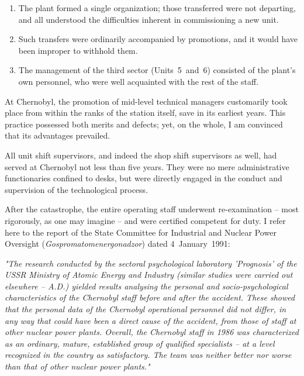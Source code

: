 \documentclass[openright]{bookest}
\begin{document}
\begin{enumerate}
  \item The plant formed a single organization; those transferred were not departing, and all understood the difficulties inherent in commissioning a new unit.
  \item Such transfers were ordinarily accompanied by promotions, and it would have been improper to withhold them.
  \item The management of the third sector (Units~5~and~6) consisted of the plant's own personnel, who were well acquainted with the rest of the staff.
\end{enumerate}

At Chernobyl, the promotion of mid-level technical managers customarily took place from within the ranks of the station itself, save in its earliest years. This practice possessed both merits and defects; yet, on the whole, I am convinced that its advantages prevailed.

All unit shift supervisors, and indeed the shop shift supervisors as well, had served at Chernobyl not less than five years. They were no mere administrative functionaries confined to desks, but were directly engaged in the conduct and supervision of the technological process.

After the catastrophe, the entire operating staff underwent re-examination -- most rigorously, as one may imagine -- and were certified competent for duty. I refer here to the report of the State Committee for Industrial and Nuclear Power Oversight (\textit{Gospromatomenergonadzor}) dated 4~January~1991:

\begin{personal}
\textit{"The research conducted by the sectoral psychological laboratory 'Prognosis' of the USSR Ministry of Atomic Energy and Industry (similar studies were carried out elsewhere -- A.D.) yielded results analysing the personal and socio-psychological characteristics of the Chernobyl staff before and after the accident. These showed that the personal data of the Chernobyl operational personnel did not differ, in any way that could have been a direct cause of the accident, from those of staff at other nuclear power plants. Overall, the Chernobyl staff in 1986 was characterized as an ordinary, mature, established group of qualified specialists -- at a level recognized in the country as satisfactory. The team was neither better nor worse than that of other nuclear power plants."}
\end{personal}
\end{document}
